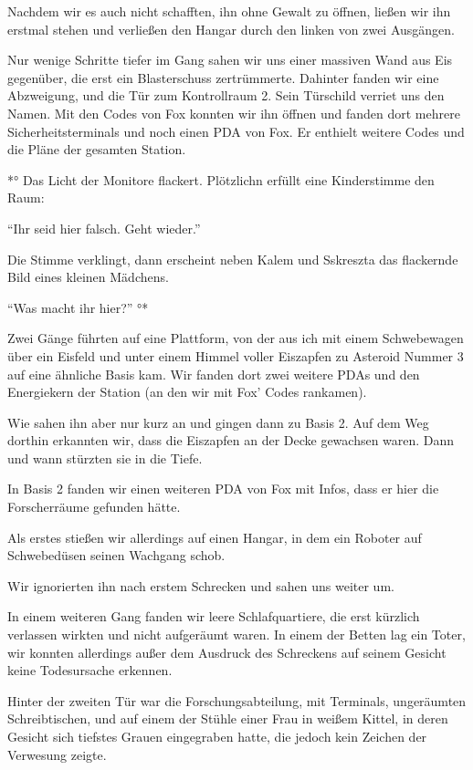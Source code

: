 \documentclass[11pt]{scrartcl}
\begin{document}
Nachdem wir es auch nicht schafften, ihn ohne Gewalt zu öffnen, ließen
wir ihn erstmal stehen und verließen den Hangar durch den linken von
zwei Ausgängen.

Nur wenige Schritte tiefer im Gang sahen wir uns einer massiven Wand aus
Eis gegenüber, die erst ein Blasterschuss zertrümmerte. Dahinter fanden
wir eine Abzweigung, und die Tür zum Kontrollraum 2. Sein Türschild
verriet uns den Namen. Mit den Codes von Fox konnten wir ihn öffnen und
fanden dort mehrere Sicherheitsterminals und noch einen PDA von Fox. Er
enthielt weitere Codes und die Pläne der gesamten Station.

*° Das Licht der Monitore flackert. Plötzlichn erfüllt eine Kinderstimme
den Raum:

``Ihr seid hier falsch. Geht wieder.''

Die Stimme verklingt, dann erscheint neben Kalem und Sskreszta das
flackernde Bild eines kleinen Mädchens.

``Was macht ihr hier?'' °*

Zwei Gänge führten auf eine Plattform, von der aus ich mit einem
Schwebewagen über ein Eisfeld und unter einem Himmel voller Eiszapfen zu
Asteroid Nummer 3 auf eine ähnliche Basis kam. Wir fanden dort zwei
weitere PDAs und den Energiekern der Station (an den wir mit Fox' Codes
rankamen).

Wie sahen ihn aber nur kurz an und gingen dann zu Basis 2. Auf dem Weg
dorthin erkannten wir, dass die Eiszapfen an der Decke gewachsen waren.
Dann und wann stürzten sie in die Tiefe.

In Basis 2 fanden wir einen weiteren PDA von Fox mit Infos, dass er hier
die Forscherräume gefunden hätte.

Als erstes stießen wir allerdings auf einen Hangar, in dem ein Roboter
auf Schwebedüsen seinen Wachgang schob.

Wir ignorierten ihn nach erstem Schrecken und sahen uns weiter um.

In einem weiteren Gang fanden wir leere Schlafquartiere, die erst
kürzlich verlassen wirkten und nicht aufgeräumt waren. In einem der
Betten lag ein Toter, wir konnten allerdings außer dem Ausdruck des
Schreckens auf seinem Gesicht keine Todesursache erkennen.

Hinter der zweiten Tür war die Forschungsabteilung, mit Terminals,
ungeräumten Schreibtischen, und auf einem der Stühle einer Frau in
weißem Kittel, in deren Gesicht sich tiefstes Grauen eingegraben hatte,
die jedoch kein Zeichen der Verwesung zeigte.
\end{document}
